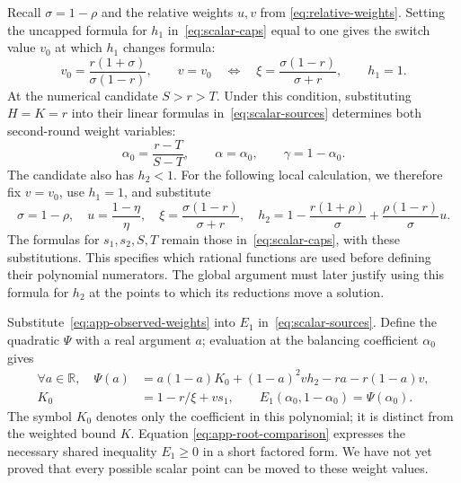 \documentclass[11pt]{article}
\theoremstyle{remark}
\theoremstyle{plain}
\begin{document}
Recall $\sigma=1-\rho$ and the relative weights $u,v$ from
\eqref{eq:relative-weights}. Setting the uncapped formula for $h_1$
in~\eqref{eq:scalar-caps} equal to one gives the switch value $v_0$
at which $h_1$ changes formula:
\begin{equation}
 v_0=\frac{r(1+\sigma)}{\sigma(1-r)},\qquad
 v=v_0\quad\Longleftrightarrow\quad
 \xi=\frac{\sigma(1-r)}{\sigma+r},\qquad h_1=1.
 \label{eq:app-cap-switch}
\end{equation}
At the numerical candidate $S>r>T$. Under this condition, substituting
$H=K=r$ into their linear formulas in~\eqref{eq:scalar-sources}
determines both second-round weight variables:
\begin{equation}
 \alpha_0=\frac{r-T}{S-T},\qquad \alpha=\alpha_0,\qquad\gamma=1-\alpha_0.
 \label{eq:app-observed-weights}
\end{equation}
The candidate also has $h_2<1$. For the following local calculation,
we therefore fix $v=v_0$, use $h_1=1$, and substitute
\begin{equation}
 \sigma=1-\rho,\quad u=\frac{1-\eta}{\eta},\quad
 \xi=\frac{\sigma(1-r)}{\sigma+r},\quad
 h_2=1-\frac{r(1+\rho)}{\sigma}
                +\frac{\rho(1-r)}{\sigma}u.
 \label{eq:app-root-substitution}
\end{equation}
The formulas for $s_1,s_2,S,T$ remain those
in~\eqref{eq:scalar-caps}, with these substitutions. This specifies
which rational functions are used before defining their polynomial
numerators. The global argument must later justify using this
formula for $h_2$ at the points to which its reductions move a
solution.

Substitute~\eqref{eq:app-observed-weights} into $E_1$
in~\eqref{eq:scalar-sources}. Define the quadratic $\Psi$ with a real
argument $a$; evaluation at the balancing coefficient $\alpha_0$ gives
\begin{equation}
 \begin{aligned}
 \forall a\in\mathbb R,\quad
 \Psi(a)&=a(1-a)K_0+(1-a)^2v h_2-ra-r(1-a)v,\\
 K_0&=1-r/\xi+vs_1,\qquad E_1(\alpha_0,1-\alpha_0)=\Psi(\alpha_0).
 \end{aligned}
 \label{eq:app-root-comparison}
\end{equation}
The symbol $K_0$ denotes only the coefficient in this polynomial;
it is distinct from the weighted bound $K$. Equation
\eqref{eq:app-root-comparison} expresses the necessary shared
inequality $E_1\ge0$ in a short factored form. We have not yet proved that every
possible scalar point can be moved to these weight values.
\end{document}
